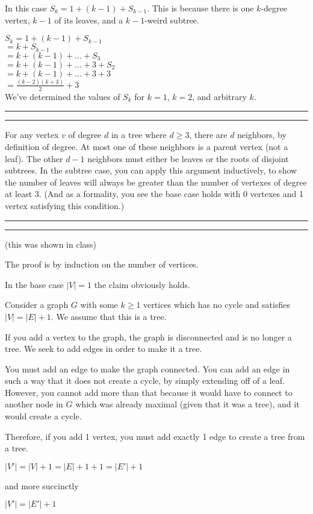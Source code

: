\documentclass[11pt,letterpaper]{article}
\newcommand{\question}[1] {\vspace{.25in} \hrule\vspace{0.5em}
\noindent{\bf #1} \vspace{0.5em}
\hrule \vspace{.10in}}
\begin{document}
In this case $S_k = 1 + (k-1) + S_{k-1}$. This is because there is one $k$-degree vertex, $k-1$ of its leaves, and a $k-1$-weird subtree.

$S_k = 1 + (k-1) + S_{k-1}$\\
$    = k + S_{k-1}$\\
$    = k + (k-1) + ... + S_3$\\
$    = k + (k-1) + ... + 3 + S_2$\\
$    = k + (k-1) + ... + 3 + 3$\\
$    = \frac{(k-2)(k+3)}{2} + 3$\\

We've determined the values of $S_k$ for $k=1$, $k=2$, and arbitrary $k$.

\question{6}
For any vertex $v$ of degree $d$ in a tree where $d \geq 3$, there are $d$ neighbors, by definition of degree.
At most one of these neighbors is a parent vertex (not a leaf). The other $d-1$ neighbors must either be leaves or the roots of disjoint subtrees.
In the subtree case, you can apply this argument inductively, to show the number of leaves will always be greater than the number of vertexes of degree at least 3.
(And as a formality, you see the base case holds with 0 vertexes and 1 vertex satisfying this condition.)


\question{7}
(this was shown in class)

The proof is by induction on the number of vertices.

In the base case $|V| = 1$ the claim obviously holds.

Consider a graph $G$ with some $k \geq 1$ vertices which has no cycle and satisfies $|V| = |E| + 1$.
We assume that this is a tree.

If you add a vertex to the graph, the graph is disconnected and is no longer a tree. We seek to add edges in order to make it a tree.

You must add an edge to make the graph connected. You can add an edge in such a way that it does not create
a cycle, by simply extending off of a leaf. However, you cannot add more than that because it would have to connect
to another node in $G$ which was already maximal (given that it was a tree), and it would create a cycle.

Therefore, if you add 1 vertex, you must add exactly 1 edge to create a tree from a tree.

$|V'| = |V| + 1 = |E| + 1 + 1 = |E'| + 1$

and more succinctly

$|V'| = |E'| + 1$
\end{document}
